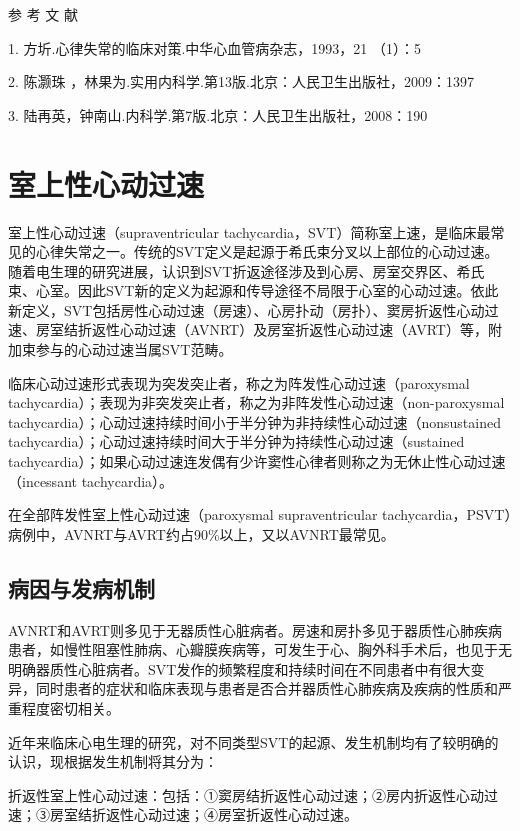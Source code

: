\hypertarget{text00288.htmlux5cux23CHP10-2-1-4}{}
参 考 文 献

1. 方圻.心律失常的临床对策.中华心血管病杂志，1993，21 （1）：5

2. 陈灏珠 ，林果为.实用内科学.第13版.北京：人民卫生出版社，2009：1397

3. 陆再英，钟南山.内科学.第7版.北京：人民卫生出版社，2008：190

\protect\hypertarget{text00289.html}{}{}

\section{室上性心动过速}

室上性心动过速（supraventricular
tachycardia，SVT）简称室上速，是临床最常见的心律失常之一。传统的SVT定义是起源于希氏束分叉以上部位的心动过速。随着电生理的研究进展，认识到SVT折返途径涉及到心房、房室交界区、希氏束、心室。因此SVT新的定义为起源和传导途径不局限于心室的心动过速。依此新定义，SVT包括房性心动过速（房速）、心房扑动（房扑）、窦房折返性心动过速、房室结折返性心动过速（AVNRT）及房室折返性心动过速（AVRT）等，附加束参与的心动过速当属SVT范畴。

临床心动过速形式表现为突发突止者，称之为阵发性心动过速（paroxysmal
tachycardia）；表现为非突发突止者，称之为非阵发性心动过速（non-paroxysmal
tachycardia）；心动过速持续时间小于半分钟为非持续性心动过速（nonsustained
tachycardia）；心动过速持续时间大于半分钟为持续性心动过速（sustained
tachycardia）；如果心动过速连发偶有少许窦性心律者则称之为无休止性心动过速（incessant
tachycardia）。

在全部阵发性室上性心动过速（paroxysmal supraventricular
tachycardia，PSVT）病例中，AVNRT与AVRT约占90\%以上，又以AVNRT最常见。

\subsection{病因与发病机制}

AVNRT和AVRT则多见于无器质性心脏病者。房速和房扑多见于器质性心肺疾病患者，如慢性阻塞性肺病、心瓣膜疾病等，可发生于心、胸外科手术后，也见于无明确器质性心脏病者。SVT发作的频繁程度和持续时间在不同患者中有很大变异，同时患者的症状和临床表现与患者是否合并器质性心肺疾病及疾病的性质和严重程度密切相关。

近年来临床心电生理的研究，对不同类型SVT的起源、发生机制均有了较明确的认识，现根据发生机制将其分为：

折返性室上性心动过速：包括：①窦房结折返性心动过速；②房内折返性心动过速；③房室结折返性心动过速；④房室折返性心动过速。

